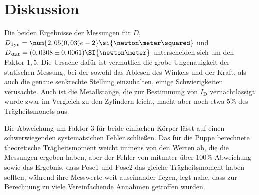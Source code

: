 \section{Diskussion}
\label{sec:Diskussion}

Die beiden Ergebnisse der Messungen für $D$, $D_{\text{dyn}} =  \num{2,05(0,03)e-2}\si{\newton\meter\squared}$ und $D_{\text{stat}} = (0,0308 \pm 0,0061)\SI{\newton \meter}$
unterscheiden sich um den Faktor $ 1,5.$ Die Ursache dafür ist vermutlich die grobe Ungenauigkeit der statischen Messung, bei der sowohl das Ablesen des Winkels und der Kraft, als auch die genaue senkrechte Stellung einzuhalten, einige Schwierigkeiten verusachte.
Auch ist die Metallstange, die zur Bestimmung von $I_{\text{D}}$ vernachtlässigt wurde zwar im Vergleich zu den Zylindern leicht, macht aber noch etwa 5\% des Trägheitsmonets aus.


Die Abweichung um Faktor $3$ für beide einfachen Körper lässt auf einen schwerwiegenden systematsichen Fehler schließen.
Das für die Puppe berechnete theoretische Trägheitsmoment weicht immens von den Werten ab,
die die Messungen ergeben haben, 
aber der Fehler von mitunter über $100\%$ Abweichung sowie das Ergebnis, 
dass Pose1 und Pose2 das gleiche Trägheitsmoment haben sollten, 
während ihre Messwerte weit auseinander liegen, legt nahe, dass zur Berechnung zu viele Vereinfachende Annahmen getroffen wurden.
